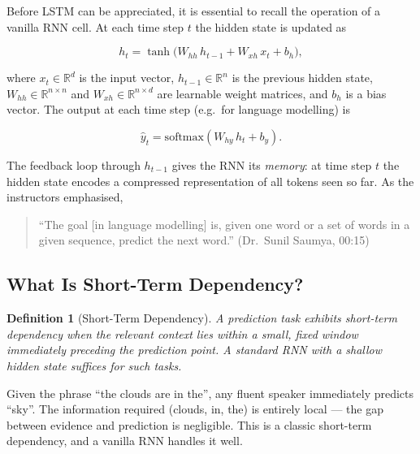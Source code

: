 \documentclass[12pt,a4paper]{article}
\newtheorem{definition}{Definition}[section]
\begin{document}
Before LSTM can be appreciated, it is essential to recall the operation of a
vanilla RNN cell. At each time step $t$ the hidden state is updated as

\begin{equation}
  \label{eq:rnn-update}
  h_t = \tanh\!\bigl(W_{hh}\,h_{t-1} + W_{xh}\,x_t + b_h\bigr),
\end{equation}

where $x_t \in \mathbb{R}^{d}$ is the input vector, $h_{t-1} \in
\mathbb{R}^{n}$ is the previous hidden state, $W_{hh} \in \mathbb{R}^{n
\times n}$ and $W_{xh} \in \mathbb{R}^{n \times d}$ are learnable weight
matrices, and $b_h$ is a bias vector. The output at each time step (e.g.\
for language modelling) is

\begin{equation}
  \label{eq:rnn-output}
  \hat{y}_t = \text{softmax}(W_{hy}\,h_t + b_y).
\end{equation}

The feedback loop through $h_{t-1}$ gives the RNN its \emph{memory}: at
time step $t$ the hidden state encodes a compressed representation of all
tokens seen so far. As the instructors emphasised,

\begin{quote}
``The goal [in language modelling] is, given one word or a set of words in a
given sequence, predict the next word.'' \hfill (Dr.\ Sunil Saumya, 00:15)
\end{quote}

\subsection{What Is Short-Term Dependency?}
\label{subsec:short-term}

\begin{definition}[Short-Term Dependency]
  \label{def:short-term}
  A prediction task exhibits \emph{short-term dependency} when the
  relevant context lies within a small, fixed window immediately preceding
  the prediction point. A standard RNN with a shallow hidden state suffices
  for such tasks.
\end{definition}

\begin{example}[title=``The clouds are in the \underline{\hspace{1.5em}}'']
  Given the phrase ``the clouds are in the'', any fluent speaker immediately
  predicts ``sky''. The information required (clouds, in, the) is entirely
  local --- the gap between evidence and prediction is negligible. This is a
  classic short-term dependency, and a vanilla RNN handles it well.
\end{example}
\end{document}

